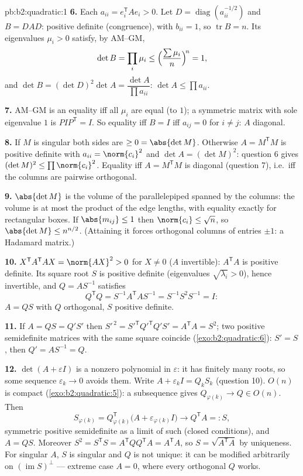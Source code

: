 \begin{solution}{pb:b2:quadratic:1}
\textbf{6.} Each $a_{ii} = e_i^{\mathsf T}Ae_i > 0$. Let $D =
\operatorname{diag}(a_{ii}^{-1/2})$ and $B = DAD$: positive
definite (congruence), with $b_{ii} = 1$, so $\operatorname{tr}
B = n$. Its eigenvalues $\mu_i > 0$ satisfy, by AM--GM,
\[
\det B = \prod_i\mu_i
\leq \Bigl(\frac{\sum\mu_i}{n}\Bigr)^{\!n} = 1 ,
\]
and $\det B = (\det D)^2\det A = \dfrac{\det A}{\prod
a_{ii}}$: $\det A \leq \prod a_{ii}$.

\textbf{7.} AM--GM is an equality iff all $\mu_i$ are equal
(to $1$); a symmetric matrix with sole eigenvalue $1$ is
$PIP^{\mathsf T} = I$. So equality iff $B = I$ iff $a_{ij} = 0$
for $i \neq j$: $A$ diagonal.

\textbf{8.} If $M$ is singular both sides are $\geq 0 =
\abs{\det M}$. Otherwise $A = M^{\mathsf T}M$ is positive
definite with $a_{ii} = \norm{c_i}^2$ and $\det A = (\det
M)^2$: question 6 gives $(\det M)^2 \leq \prod\norm{c_i}^2$.
Equality iff $A = M^{\mathsf T}M$ is diagonal (question 7),
i.e.\ iff the columns are pairwise orthogonal.

\textbf{9.} $\abs{\det M}$ is the volume of the parallelepiped
spanned by the columns: the volume is at most the product of
the edge lengths, with equality exactly for rectangular boxes.
If $\abs{m_{ij}} \leq 1$ then $\norm{c_i} \leq \sqrt n$, so
$\abs{\det M} \leq n^{n/2}$. (Attaining it forces orthogonal
columns of entries $\pm1$: a Hadamard matrix.)

\textbf{10.} $X^{\mathsf T}A^{\mathsf T}AX = \norm{AX}^2 > 0$
for $X \neq 0$ ($A$ invertible): $A^{\mathsf T}A$ is positive
definite. Its square root $S$ is positive definite (eigenvalues
$\sqrt{\lambda_i} > 0$), hence invertible, and $Q = AS^{-1}$
satisfies
\[
Q^{\mathsf T}Q = S^{-1}A^{\mathsf T}AS^{-1}
= S^{-1}S^2S^{-1} = I :
\]
$A = QS$ with $Q$ orthogonal, $S$ positive definite.

\textbf{11.} If $A = QS = Q'S'$ then $S'^{\,2} =
S'^{\mathsf T}Q'^{\mathsf T}Q'S' = A^{\mathsf T}A = S^2$; two
positive semidefinite matrices with the same square coincide
(\cref{exo:b2:quadratic:6}): $S' = S$, then $Q' = AS^{-1} =
Q$.

\textbf{12.} $\det(A + \varepsilon I)$ is a nonzero polynomial
in $\varepsilon$: it has finitely many roots, so some sequence
$\varepsilon_k \to 0$ avoids them. Write $A + \varepsilon_kI =
Q_kS_k$ (question 10). $O(n)$ is compact
(\cref{exo:b2:quadratic:5}): a subsequence gives $Q_{\varphi(k)}
\to Q \in O(n)$. Then
\[
S_{\varphi(k)} = Q_{\varphi(k)}^{\mathsf T}
\bigl(A + \varepsilon_{\varphi(k)}I\bigr)
\longrightarrow Q^{\mathsf T}A =: S,
\]
symmetric positive semidefinite as a limit of such (closed
conditions), and $A = QS$. Moreover $S^2 = S^{\mathsf T}S =
A^{\mathsf T}QQ^{\mathsf T}A = A^{\mathsf T}A$, so $S =
\sqrt{A^{\mathsf T}A}$ by uniqueness. For singular $A$, $S$ is
singular and $Q$ is not unique: it can be modified arbitrarily
on $(\operatorname{im} S)^{\perp}$ --- extreme case $A = 0$,
where every orthogonal $Q$ works.


\end{solution}
